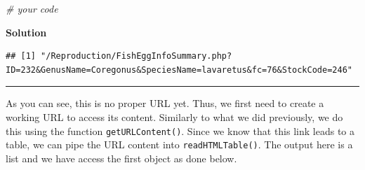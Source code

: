 \documentclass[
]{book}
\newenvironment{Shaded}{\begin{snugshade}}{\end{snugshade}}
\newcommand{\CommentTok}[1]{\textcolor[rgb]{0.56,0.35,0.01}{\textit{#1}}}
\newcommand{\DataTypeTok}[1]{\textcolor[rgb]{0.13,0.29,0.53}{#1}}
\newcommand{\DecValTok}[1]{\textcolor[rgb]{0.00,0.00,0.81}{#1}}
\newcommand{\KeywordTok}[1]{\textcolor[rgb]{0.13,0.29,0.53}{\textbf{#1}}}
\newcommand{\NormalTok}[1]{#1}
\newcommand{\OperatorTok}[1]{\textcolor[rgb]{0.81,0.36,0.00}{\textbf{#1}}}
\newcommand{\OtherTok}[1]{\textcolor[rgb]{0.56,0.35,0.01}{#1}}
\newcommand{\StringTok}[1]{\textcolor[rgb]{0.31,0.60,0.02}{#1}}
\begin{document}
\begin{Shaded}
\begin{Highlighting}[]
\CommentTok{# your code}
\end{Highlighting}
\end{Shaded}

\textbf{Solution}

\begin{Shaded}
\end{Shaded}

\begin{verbatim}
## [1] "/Reproduction/FishEggInfoSummary.php?ID=232&GenusName=Coregonus&SpeciesName=lavaretus&fc=76&StockCode=246"
\end{verbatim}

\begin{center}\rule{0.5\linewidth}{0.5pt}\end{center}

As you can see, this is no proper URL yet. Thus, we first need to create a working URL to access its content. Similarly to what we did previously, we do this using the function \texttt{getURLContent()}. Since we know that this link leads to a table, we can pipe the URL content into \texttt{readHTMLTable()}. The output here is a list and we have access the first object as done below.

\begin{Shaded}
\end{Shaded}
\end{document}
